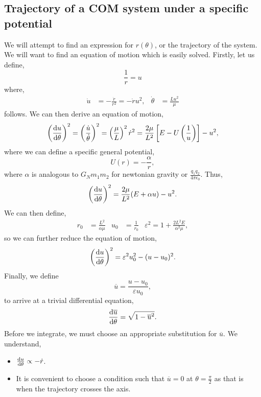 \documentclass{book}
\begin{document}
\subsection{Trajectory of a COM system under a specific potential}
We will attempt to find an expression for $r(\theta)$, or the trajectory of the system. We will want to find an equation of motion which is easily solved. Firstly, let us define,
\begin{equation}
    \frac{1}{r} = u
\end{equation}
where,
\begin{align}
    \Dot{u} &= - \frac{\Dot{r}}{r^2} = -\Dot{r}u^2, & \Dot{\theta} &= \frac{Lu^2}{\mu}
\end{align}
follows. We can then derive an equation of motion,
\begin{equation}
    \left(\dv{u}{\theta}\right)^2 = \left(\frac{\Dot{u}}{\Dot{\theta}}\right)^2 = \left(\frac{\mu}{L}\right)^2\Dot{r}^2 = \frac{2\mu}{L^2}\left[E - U\left(\frac{1}{u}\right)\right] - u^2,
\end{equation}
where we can define a specific general potential,
\begin{equation}
    U(r) = -\frac{\alpha}{r},
\end{equation}
where $\alpha$ is analogous to $G_Nm_1m_2$ for newtonian gravity or $\frac{q_1q_2}{4\pi\epsilon_0}$. Thus, 
\begin{equation}
    \left(\dv{u}{\theta}\right)^2 = \frac{2\mu}{L^2}(E + \alpha u) - u^2.
\end{equation}
We can then define,
\begin{align}
    r_0 &= \frac{L^2}{\alpha \mu} & u_0 &= \frac{1}{r_0}  & \varepsilon^2 = 1 + \frac{2L^2E}{\alpha^2 \mu}, \label{propertiespotential}
\end{align}
so we can further reduce the equation of motion,
\begin{equation}
    \left(\dv{u}{\theta}\right)^2 = \varepsilon^2u_0^2 - (u-u_0)^2.
\end{equation}
Finally, we define
\begin{equation}
    \overline{u} = \frac{u-u_0}{\varepsilon u_0},
\end{equation}
to arrive at a trivial differential equation,
\begin{equation}
    \dv{\overline{u}}{\theta} = \sqrt{1 - \overline{u}^2}.
\end{equation}
Before we integrate, we must choose an appropriate substitution for $\overline{u}$. We understand, 
\begin{itemize}
    \item $\dv{u}{\theta} \propto -\Dot{r}$.
    \item It is convenient to choose a condition such that $\overline{u} = 0$ at $\theta = \frac{\pi}{2}$ as that is when the trajectory crosses the axis.
\end{itemize}
\end{document}

